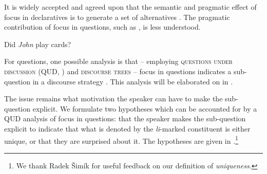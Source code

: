 \documentclass[output=paper,
colorlinks,
citecolor=brown,
newtxmath
]{langscibook}
\begin{document}
It is widely accepted and agreed upon that the semantic and pragmatic effect of focus in declaratives is to generate a set of alternatives \citep{rooth1992}.  The pragmatic contribution of focus in questions, such as , is less understood.



\ea Did \emph{John} play cards? \label{didjohn}
\z


\noindent
For questions, one possible analysis is that -- employing \textsc{questions under discussion} (QUD, \citealt{Roberts2012}) and \textsc{discourse trees} \citep{Buering2003} -- focus in questions indicates a sub-question in a discourse strategy \citep{biezma2009, kamali.buering2011}. This analysis will be elaborated on in .


The issue remains what motivation the speaker can have to make the sub-question explicit.
We formulate two hypotheses which can be accounted for by a QUD analysis of focus in questions: that the speaker makes the sub-question explicit to indicate that what is denoted by the \textit{li}-marked constituent is either unique, or that they are surprised about it. The hypotheses are given in .\footnote{We thank Radek Šimík for useful feedback on our definition of \textit{uniqueness}.}
\end{document}
